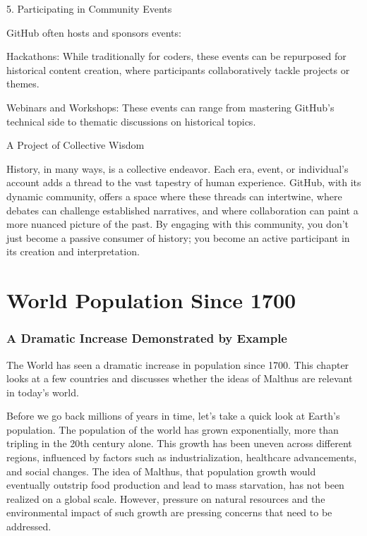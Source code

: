 \documentclass[a4paper,12pt]{book}
\begin{document}
5. Participating in Community Events

GitHub often hosts and sponsors events:

Hackathons: While traditionally for coders, these events can be repurposed for historical content creation, where participants collaboratively tackle projects or themes.

Webinars and Workshops: These events can range from mastering GitHub's technical side to thematic discussions on historical topics.

A Project of Collective Wisdom

History, in many ways, is a collective endeavor. Each era, event, or individual's account adds a thread to the vast tapestry of human experience. GitHub, with its dynamic community, offers a space where these threads can intertwine, where debates can challenge established narratives, and where collaboration can paint a more nuanced picture of the past. By engaging with this community, you don't just become a passive consumer of history; you become an active participant in its creation and interpretation.

\chapter{World Population Since 1700}
\subsection*{A Dramatic Increase Demonstrated by Example}
The World has seen a dramatic increase in population since 1700. This chapter looks at a few countries and discusses whether the ideas of Malthus are relevant in today's world.



Before we go back millions of years in time, let's take a quick look at Earth's population. The population of the world has grown exponentially, more than tripling in the 20th century alone. This growth has been uneven across different regions, influenced by factors such as industrialization, healthcare advancements, and social changes. The idea of Malthus, that population growth would eventually outstrip food production and lead to mass starvation, has not been realized on a global scale. However, pressure on natural resources and the environmental impact of such growth are pressing concerns that need to be addressed.
















\end{document}
